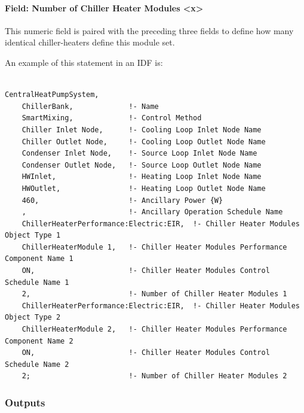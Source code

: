 \paragraph{Field: Number of Chiller Heater Modules \textless{}x\textgreater{}}\label{field-number-of-chiller-heater-modules-x}

This numeric field is paired with the preceding three fields to define how many identical chiller-heaters define this module set.

An example of this statement in an IDF is:

\begin{lstlisting}

CentralHeatPumpSystem,
    ChillerBank,             !- Name
    SmartMixing,             !- Control Method
    Chiller Inlet Node,      !- Cooling Loop Inlet Node Name
    Chiller Outlet Node,     !- Cooling Loop Outlet Node Name
    Condenser Inlet Node,    !- Source Loop Inlet Node Name
    Condenser Outlet Node,   !- Source Loop Outlet Node Name
    HWInlet,                 !- Heating Loop Inlet Node Name
    HWOutlet,                !- Heating Loop Outlet Node Name
    460,                     !- Ancillary Power {W}
    ,                        !- Ancillary Operation Schedule Name
    ChillerHeaterPerformance:Electric:EIR,  !- Chiller Heater Modules Object Type 1
    ChillerHeaterModule 1,   !- Chiller Heater Modules Performance Component Name 1
    ON,                      !- Chiller Heater Modules Control Schedule Name 1
    2,                       !- Number of Chiller Heater Modules 1
    ChillerHeaterPerformance:Electric:EIR,  !- Chiller Heater Modules Object Type 2
    ChillerHeaterModule 2,   !- Chiller Heater Modules Performance Component Name 2
    ON,                      !- Chiller Heater Modules Control Schedule Name 2
    2;                       !- Number of Chiller Heater Modules 2
\end{lstlisting}

\subsubsection{Outputs}\label{outputs-17-000}

